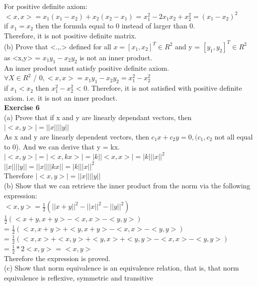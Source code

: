 \documentclass{article}
\begin{document}
For positive definite axiom:\\
$<x,x> = x_1(x_1 - x_2) + x_2(x_2 - x_1)$ = $x_1 ^2 - 2 x_1 x_2 + x_2^2 = (x_1 - x_2)^2 $\\if $x_1 = x_2$ then the formula equal to 0 instead of larger than 0.\\
Therefore, it is not positive definite matrix.\\

(b) Prove that <.,.> defined for all $x = [x_1, x_2]^T \in R^2$ and y = $[y_1,y_2]^T \in R^2$ as <x,y> = $x_1y_1-x_2y_2$ is not an inner product.\\

An inner product must satisfy positive definite axiom.\\ 
$\forall X \in R^2$ / ${0}, <x,x> = x_1y_1 - x_2y_2 = x_1^2 - x_2^2$ \\
if $x_1 < x_2 $ then $x_1^2 - x_2^2$ < 0. Therefore, it is not satisfied with positive definite axiom. i.e. it is not an inner product.\\


\textbf{Exercise 6}\\
(a) Prove that if x and y are linearly dependant vectors, then $|<x,y>| = ||x|| ||y||$\\
As x and y are linearly dependent vectors, then $c_1x + c_2y = 0, (c_1,c_2$  not all equal to 0). And we can derive that y = kx. \\
$|<x,y>| = |<x,kx>| = |k| |<x,x>| = |k| ||x||^{2}$\\
$||x|| ||y|| = ||x|| ||kx|| = |k| ||x||^{2}$\\
Therefore $|<x,y>| = ||x|| ||y||$\\
(b) Show that we can retrieve the inner product from the norm via the following expression:\\
$<x,y> = \frac{1}{2} (||x + y||^2 - ||x||^2 - ||y||^2)$\\

$\frac{1}{2} (<x+y,x+y> - <x,x> - <y,y>) $
\\ = $\frac{1}{2} (<x,x+y> + <y,x+y> - <x,x> - <y,y>)$\\
= $\frac{1}{2} (<x,x> + <x,y> + <y,x> + <y,y> - <x,x> - <y,y>) $\\
= $\frac{1}{2} * 2<x,y>$ = $<x,y>$ \\

Therefore the expression is proved.\\

(c) Show that norm equivalence is an equivalence relation, that is, that norm equivalence is reflexive, symmetric and transitive\\
\end{document}
